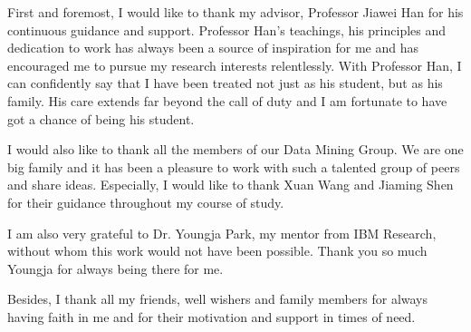 First and foremost, I would like to thank my advisor, Professor Jiawei Han for his continuous guidance and support. Professor Han's teachings, his principles and dedication to work has always been a source of inspiration for me and has encouraged me to pursue my research interests relentlessly. With Professor Han, I can confidently say that I have been treated not just as his student, but as his family. His care extends far beyond the call of duty and I am fortunate to have got a chance of being his student.

I would also like to thank all the members of our Data Mining Group. We are one big family and it has been a pleasure to work with such a talented group of peers and share ideas. Especially, I would like to thank Xuan Wang and Jiaming Shen for their guidance throughout my course of study.

I am also very grateful to Dr. Youngja Park, my mentor from IBM Research, without whom this work would not have been possible. Thank you so much Youngja for always being there for me.

Besides, I thank all my friends, well wishers and family members for always having faith in me and for their motivation and support in times of need.